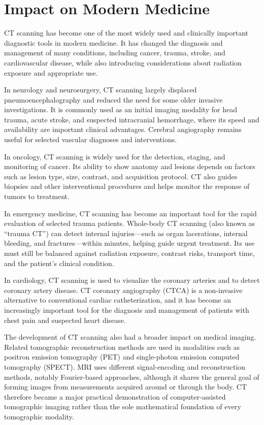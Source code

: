 \section{Impact on Modern Medicine}

CT scanning has become one of the most widely used and clinically important diagnostic tools in modern medicine. It has changed the diagnosis and management of many conditions, including cancer, trauma, stroke, and cardiovascular disease, while also introducing considerations about radiation exposure and appropriate use.

In neurology and neurosurgery, CT scanning largely displaced pneumoencephalography and reduced the need for some older invasive investigations. It is commonly used as an initial imaging modality for head trauma, acute stroke, and suspected intracranial hemorrhage, where its speed and availability are important clinical advantages. Cerebral angiography remains useful for selected vascular diagnoses and interventions.

In oncology, CT scanning is widely used for the detection, staging, and monitoring of cancer. Its ability to show anatomy and lesions depends on factors such as lesion type, size, contrast, and acquisition protocol. CT also guides biopsies and other interventional procedures and helps monitor the response of tumors to treatment.

In emergency medicine, CT scanning has become an important tool for the rapid evaluation of selected trauma patients. Whole-body CT scanning (also known as ``trauma CT'') can detect internal injuries---such as organ lacerations, internal bleeding, and fractures---within minutes, helping guide urgent treatment. Its use must still be balanced against radiation exposure, contrast risks, transport time, and the patient's clinical condition.

In cardiology, CT scanning is used to visualize the coronary arteries and to detect coronary artery disease. CT coronary angiography (CTCA) is a non-invasive alternative to conventional cardiac catheterization, and it has become an increasingly important tool for the diagnosis and management of patients with chest pain and suspected heart disease.

The development of CT scanning also had a broader impact on medical imaging. Related tomographic reconstruction methods are used in modalities such as positron emission tomography (PET) and single-photon emission computed tomography (SPECT). MRI uses different signal-encoding and reconstruction methods, notably Fourier-based approaches, although it shares the general goal of forming images from measurements acquired around or through the body. CT therefore became a major practical demonstration of computer-assisted tomographic imaging rather than the sole mathematical foundation of every tomographic modality.


